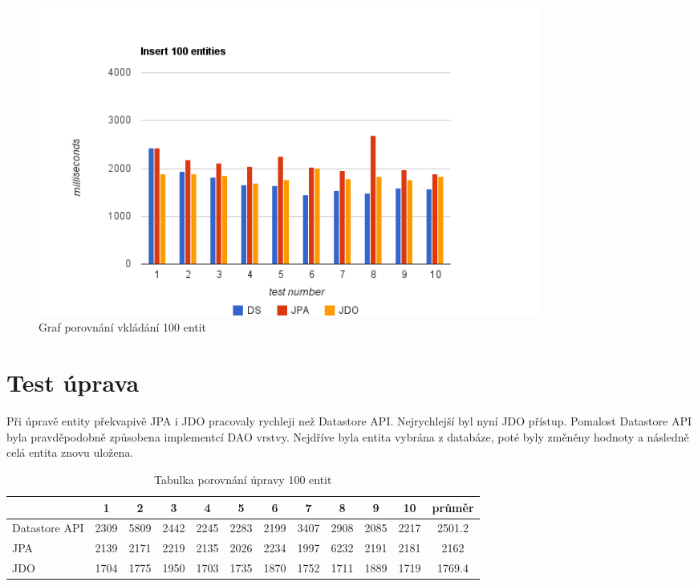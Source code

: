 \begin{figure}[h]
\begin{center}
\includegraphics[width=6.5in]{figures/insert.png}
\caption{Graf porovnání vkládání 100 entit}
\label{fig:insert}
\end{center}
\end{figure}

\section{Test úprava}

Při úpravě entity překvapivě JPA i JDO pracovaly rychleji než Datastore API. Nejrychlejší byl nyní JDO přístup. Pomalost Datastore API byla pravděpodobně způsobena implementcí DAO vrstvy. Nejdříve byla entita vybrána z databáze, poté byly změněny hodnoty a následně celá entita znovu uložena.

\begin{table}[h]
\centering
\caption{Tabulka porovnání úpravy 100 entit }\label{tab:update}
\begin{tabular}{|l|c|c|c|c|c|c|c|c|c|c|c|}
   \hline
	& 1		& 2		& 3		& 4		& 5		& 6		& 7		& 8		& 9		& 10		& průměr \\
   \hline
Datastore API	& 2309	& 5809	& 2442	& 2245	& 2283	& 2199	& 3407	& 2908	& 2085	& 2217	& 2501.2 \\
JPA	& 2139	& 2171	& 2219	& 2135	& 2026	& 2234	& 1997	& 6232	& 2191	& 2181	& 2162 \\
JDO	& 1704	& 1775	& 1950	& 1703	& 1735	& 1870	& 1752	& 1711	& 1889	& 1719	& 1769.4 \\
   \hline
\end{tabular}
\end{table}

